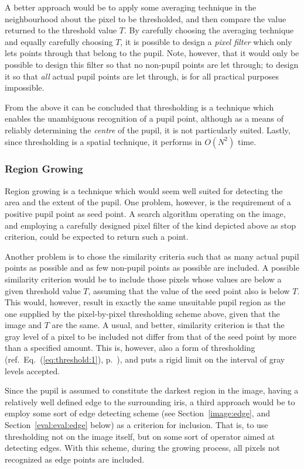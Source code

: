 A better approach would be to apply some averaging technique in the
neighbourhood about the pixel to be thresholded, and then compare the
value returned to the threshold value $T$.  By carefully choosing the
averaging technique and equally carefully choosing $T$, it is possible
to design a {\em pixel filter\/} which only lets points through that
belong to the pupil.  Note, however, that it would only be possible to
design this filter so that no non-pupil points are let through; to
design it so that {\em all\/} actual pupil points are let through, is
for all practical purposes impossible.

From the above it can be concluded that thresholding is a technique
which enables the unambiguous recognition of a pupil point, although
as a means of reliably determining the {\em centre\/} of the pupil, it 
is not particularly suited.  Lastly, since thresholding is a spatial
technique, it performs in $O(N^{2})$ time.

\subsubsection{Region Growing}

Region growing is a technique which would seem well suited for
detecting the area and the extent of the pupil.  One problem, however,
is the requirement of a positive pupil point as seed point.  A search
algorithm operating on the image, and employing a carefully designed
pixel filter of the kind depicted above as stop criterion, could be
expected to return such a point.

Another problem is to chose the similarity criteria such that as many
actual pupil points as possible and as few non-pupil points as
possible are included.  A possible similarity criterion would be to
include those pixels whose values are below a given threshold value
$T$, assuming that the value of the seed point also is below $T$.
This would, however, result in exactly the same unsuitable pupil
region as the one supplied by the pixel-by-pixel thresholding scheme
above, given that the image and $T$ are the same.  A usual, and
better, similarity criterion is that the gray level of a pixel to be
included not differ from that of the seed point by more than a
specified amount.  This is, however, also a form of thresholding
(ref.\ Eq.~(\ref{eq:threshold:1}), p.~\pageref{eq:threshold:1}), and
puts a rigid limit on the interval of gray levels accepted.

Since the pupil is assumed to constitute the darkest region in the
image, having a relatively well defined edge to the surrounding iris,
a third approach would be to employ some sort of edge detecting scheme
(see Section~\ref{image:edge}, and Section~\ref{eval:eval:edge}
below) as a criterion for inclusion.  That is, to use thresholding not
on the image itself, but on some sort of operator aimed at detecting
edges.  With this scheme, during the growing process, all pixels not
recognized as edge points are included.


